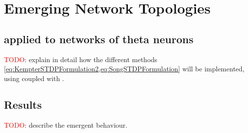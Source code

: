 \newpage
\section{\mywork Emerging Network Topologies}
\subsection{\STDP applied to networks of theta neurons}
\textcolor{red}{TODO}: explain in detail how the different methods \cref{eq:KempterSTDPFormulation2,eq:SongSTDPFormulation} will be implemented, using \STDP coupled with \IP.


\subsection{Results}
\textcolor{red}{TODO}: describe the emergent behaviour.

